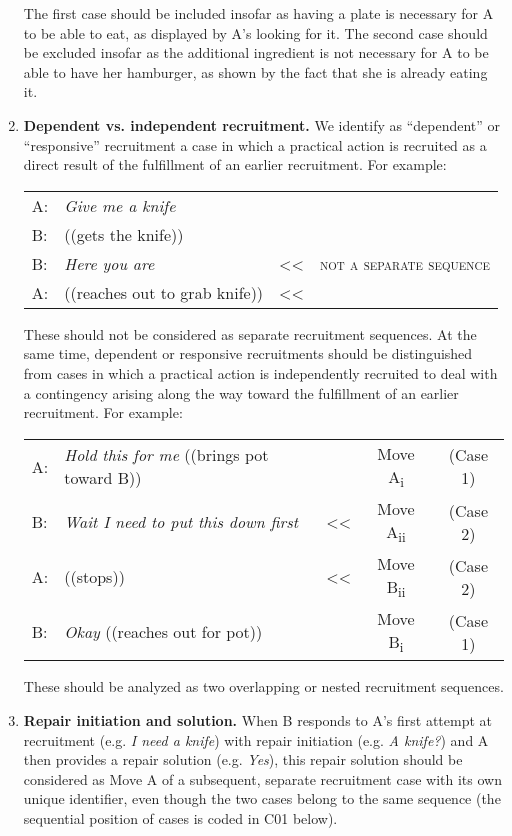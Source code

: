 \documentclass[output=paper]{langsci/langscibook}
\begin{document}
\begin{enumerate}
The first case should be included insofar as having a plate is necessary for A to be able to eat, as displayed by A’s looking for it. The second case should be excluded insofar as the additional ingredient is not necessary for A to be able to have her hamburger, as shown by the fact that she is already eating it.

\item \textbf{Dependent vs. independent recruitment.} We identify as “dependent” or “responsive” recruitment a case in which a practical action is recruited as a direct result of the fulfillment of an earlier recruitment. For example:

\begin{tabular}{l l l l }
A: & \textit{Give me a knife} & & \\
B: & ((gets the knife)) & & \\
B: & \textit{Here you are} & << & \textsc{not} \textsc{a} \textsc{separate sequence} \\
A: & ((reaches out to grab knife)) & << \\
\end{tabular}

These should {not} be considered as separate recruitment sequences. At the same time, dependent or responsive recruitments should be distinguished from cases in which a practical action is independently recruited to deal with a contingency arising along the way toward the fulfillment of an earlier recruitment. For example:

\begin{tabular}{l l c c c}
A: & \textit{Hold this for me} ((brings pot toward B)) & & Move A\textsubscript{i} & (Case 1) \\
B: & \textit{Wait I need to put this down first} & << & Move A\textsubscript{ii} & (Case 2) \\
A: & ((stops)) & << & Move B\textsubscript{ii} &  (Case 2) \\
B: & \textit{Okay} ((reaches out for pot)) & & Move B\textsubscript{i} & (Case 1) \\
\end{tabular}

These should be analyzed as two overlapping or nested recruitment sequences.

\item \textbf{Repair initiation and solution.} When B responds to A’s first attempt at recruitment (e.g. \textit{I need a knife}) with repair initiation (e.g. \textit{A knife?}) and A then provides a repair solution (e.g. \textit{Yes}), this repair solution should be considered as Move A of a subsequent, separate recruitment case with its own unique identifier, even though the two cases belong to the same sequence (the sequential position of cases is coded in C01 below).


\end{enumerate}
\end{document}
